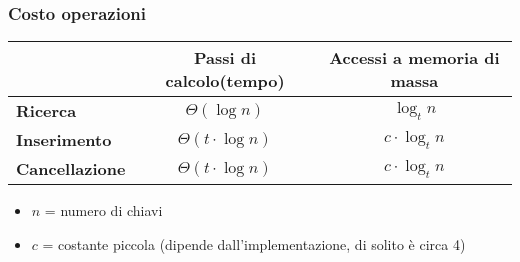 \subsubsection*{Costo operazioni}

\begin{tabular}{|l|c|c|}
    \hline
    \space & \textbf{Passi di calcolo(tempo)} & \textbf{Accessi a memoria di massa}\\
    \hline
    \textbf{Ricerca} & $\Theta(\log n)$ & $\log_t n$\\
    \hline
    \textbf{Inserimento} & $\Theta(t \cdot \log n)$ & $c \cdot \log_t n$\\
    \hline
    \textbf{Cancellazione} & $\Theta(t \cdot \log n)$ & $c \cdot \log_t n$\\
    \hline
\end{tabular}
\begin{itemize}
    \item $n$ = numero di chiavi
    \item $c$ = costante piccola (dipende dall'implementazione, di solito è circa 4)
\end{itemize}

\clearpage



